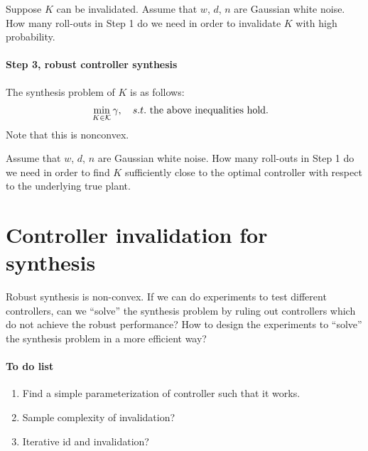 \documentclass[11pt, onecolumn]{article}
\begin{document}
Suppose $K$ can be invalidated. Assume that $w$, $d$, $n$ are Gaussian white noise. How many
roll-outs in Step 1 do we need in order to invalidate $K$ with high probability.


\paragraph{Step 3, robust controller synthesis}
The synthesis problem of $K$ is as follows:
\begin{align*}
  &\min_{K\in\mathcal K} \gamma,\quad s.t. \text{ the above inequalities hold}.
\end{align*}
Note that this is  nonconvex.

Assume that $w$, $d$, $n$ are Gaussian white noise. How many roll-outs in Step 1 do we need in order
to find $K$ sufficiently close to the optimal controller with respect to the underlying true plant.






\newpage



\section{Controller invalidation for synthesis}
Robust synthesis is non-convex.  If we can do experiments to test different controllers, can we
``solve'' the synthesis problem by ruling out controllers which do not achieve the robust
performance? How to design the experiments to ``solve'' the synthesis problem in a more efficient
way?


\paragraph{To do list }
\begin{enumerate}
\item Find a simple parameterization of controller such that it works.
\item Sample complexity of invalidation?
\item Iterative id and invalidation?
\end{enumerate}
\end{document}

